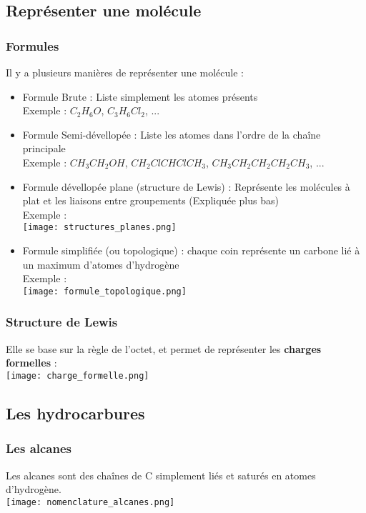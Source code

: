 \documentclass{article}
\begin{document}
    \subsection{Représenter une molécule}
        \subsubsection{Formules}
            Il y a plusieurs manières de représenter une molécule :
            \begin{itemize}
                \item Formule Brute : Liste simplement les atomes présents \\
                Exemple : $C_2 H_6 O$, $C_3 H_6 Cl_2$, ... 
                \item Formule Semi-dévellopée : Liste les atomes dans l'ordre de la chaîne principale \\
                Exemple : $CH_3CH_2OH$, $CH_2ClCHClCH_3$, $CH_3CH_2CH_2CH_2CH_3$, ... 
                \item Formule dévellopée plane (structure de Lewis) : Représente les molécules à plat et les liaisons entre groupements (Expliquée plus bas)\\
                Exemple :\\
                \texttt{[image: structures\_planes.png]}
                \item Formule simplifiée (ou topologique) : chaque coin représente un carbone lié à un maximum d'atomes d'hydrogène \\
                Exemple :\\
                \texttt{[image: formule\_topologique.png]}
            \end{itemize}
        
        \subsubsection{Structure de Lewis}
            Elle se base sur la règle de l'octet, et permet de représenter les \textbf{charges formelles} : \\
            \texttt{[image: charge\_formelle.png]}

    \subsection{Les hydrocarbures}
        \subsubsection{Les alcanes}
            Les alcanes sont des chaînes de C simplement liés et saturés en atomes d'hydrogène. \\
            \texttt{[image: nomenclature\_alcanes.png]}
        
\end{document}
